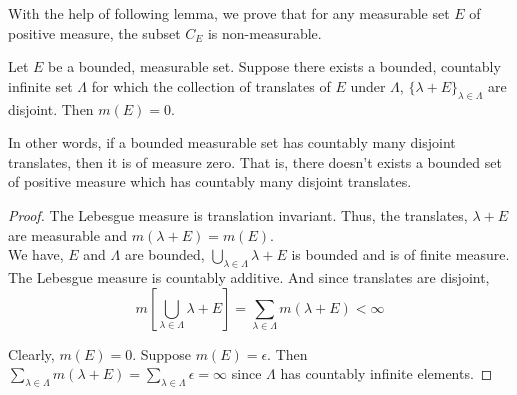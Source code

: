 	With the help of following lemma, we prove that for any measurable set $E$ of positive measure, the subset $C_E$ is non-measurable.

\begin{lemma}
	Let $E$ be a bounded, measurable set.
	Suppose there exists a bounded, countably infinite set $\Lambda$ for which the collection of translates of $E$ under $\Lambda$, $\{ \lambda + E \}_{\lambda \in \Lambda}$ are disjoint.
	Then $m(E) = 0$.
\end{lemma}
In other words, if a bounded measurable set has countably many disjoint translates, then it is of measure zero.
That is, there doesn't exists a bounded set of positive measure which has countably many disjoint translates.
\begin{proof}
	The Lebesgue measure is translation invariant.
	Thus, the translates, $\lambda + E$ are measurable and $m(\lambda + E) = m(E)$.\\

	We have, $E$ and $\Lambda$ are bounded, $\displaystyle \bigcup_{\lambda \in \Lambda}\lambda + E$ is bounded and is of finite measure.
	The Lebesgue measure is countably additive.
	And since translates are disjoint,
\begin{equation*}
	m \left[ \bigcup_{\lambda \in \Lambda} \lambda + E \right] = \sum_{\lambda \in \Lambda} m(\lambda+E) < \infty
\end{equation*}

	Clearly, $m(E) = 0$.
	Suppose $m(E) = \epsilon$.
	Then $\displaystyle \sum_{\lambda \in \Lambda} m(\lambda + E) = \sum_{\lambda \in \Lambda} \epsilon = \infty$ since $\Lambda$ has countably infinite elements.
\end{proof}

